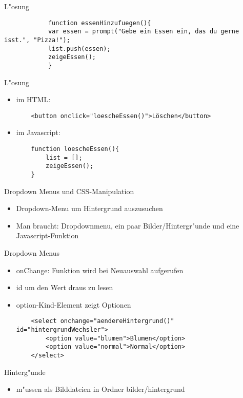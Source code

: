 \documentclass[18pt]{beamer}
\begin{document}
\begin{frame}[fragile]{L"osung}
		\begin{lstlisting}
			function essenHinzufuegen(){
			var essen = prompt("Gebe ein Essen ein, das du gerne isst.", "Pizza!");
			list.push(essen);
			zeigeEssen();
			}
		\end{lstlisting}
\end{frame}

\begin{frame}[fragile]{L"osung}
\begin{itemize}
	\item im HTML: 
	\begin{lstlisting}
	<button onclick="loescheEssen()">Löschen</button>
	\end{lstlisting}
	\item im Javascript:
	\begin{lstlisting}
	function loescheEssen(){
		list = [];
		zeigeEssen();
	}
	\end{lstlisting}
\end{itemize}
\end{frame}

\begin{frame}[fragile]{Dropdown Menus und CSS-Manipulation}
\begin{itemize}
	\item Dropdown-Menu um Hintergrund auszusuchen
	\item Man braucht: Dropdownmenu, ein paar Bilder/Hintergr"unde und eine Javascript-Funktion 
\end{itemize}
\end{frame}

\begin{frame}[fragile]{Dropdown Menus}
\begin{itemize}
	\item onChange: Funktion wird bei Neuauswahl aufgerufen
	\item id um den Wert draus zu lesen
	\item option-Kind-Element zeigt Optionen

\begin{lstlisting}
	<select onchange="aendereHintergrund()"  id="hintergrundWechsler">
		<option value="blumen">Blumen</option>
		<option value="normal">Normal</option>
	</select>
\end{lstlisting}
\end{itemize}
\end{frame}

\begin{frame}[fragile]{Hinterg"unde}
\begin{itemize}
	\item m"ussen als Bilddateien in Ordner bilder/hintergrund
	
\end{itemize}
\end{frame}
\end{document}

